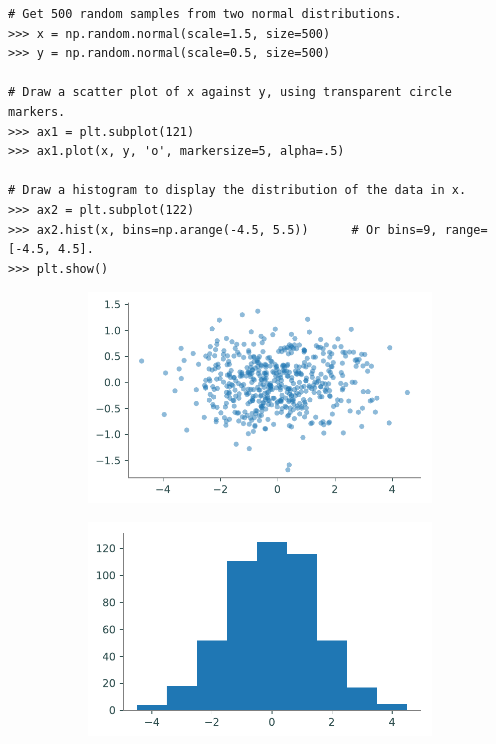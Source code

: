 \begin{lstlisting}
# Get 500 random samples from two normal distributions.
>>> x = np.random.normal(scale=1.5, size=500)
>>> y = np.random.normal(scale=0.5, size=500)

# Draw a scatter plot of x against y, using transparent circle markers.
>>> ax1 = plt.subplot(121)
>>> ax1.plot(x, y, 'o', markersize=5, alpha=.5)

# Draw a histogram to display the distribution of the data in x.
>>> ax2 = plt.subplot(122)
>>> ax2.hist(x, bins=np.arange(-4.5, 5.5))      # Or bins=9, range=[-4.5, 4.5].
>>> plt.show()
\end{lstlisting}

\begin{figure}[H]
\captionsetup[subfigure]{justification=centering}
\centering
\begin{framed}
\begin{subfigure}{.49\textwidth}
    \centering
    \includegraphics[width=\linewidth]{figures/scatterplot.pdf}
\end{subfigure}
%
\begin{subfigure}{.49\textwidth}
    \centering
    \includegraphics[width=\linewidth]{figures/histogram.pdf}
\end{subfigure}
\end{framed}
\end{figure}

